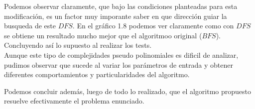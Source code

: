 Podemos observar claramente, que bajo las condiciones planteadas para esta modificación, es un factor muy imporante saber en que dirección guiar la busqueda de este $DFS$. En el gráfico 1.8 podemos ver claramente como con $DFS$ se obtiene un resultado mucho mejor que el algoritmoo original ($BFS$). Concluyendo así lo supuesto al realizar los tests.\\

Aunque este tipo de complejidades pseudo polinomiales es dificil de analizar, pudimos observar que sucede al variar los parámetros de entrada y obtener diferentes comportamientos y particularidades del algoritmo.

Podemos concluir además, luego de todo lo realizado, que el algoritmo propuesto resuelve efectivamente el problema enunciado.
